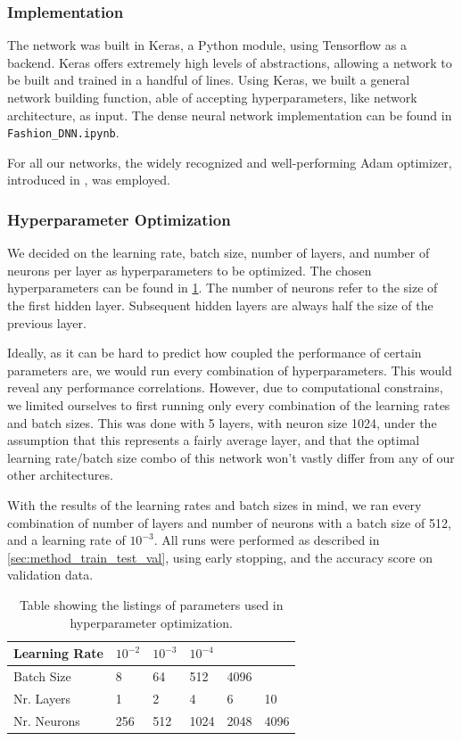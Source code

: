 \documentclass[10pt, twocolumn]{article}
\begin{document}
\subsubsection{Implementation}
The network was built in Keras, a Python module, using Tensorflow as a backend. Keras offers extremely high levels of abstractions, allowing a network to be built and trained in a handful of lines. Using Keras, we built a general network building function, able of accepting hyperparameters, like network architecture, as input. The dense neural network implementation can be found in \texttt{Fashion\_DNN.ipynb}.

For all our networks, the widely recognized and well-performing Adam optimizer, introduced in \cite{adam}, was employed.



\subsubsection{Hyperparameter Optimization}
\label{sec:method_DNN_hp}
We decided on the learning rate, batch size, number of layers, and number of neurons per layer as hyperparameters to be optimized. The chosen hyperparameters can be found in \cref{tab:hp_table_DNN}. The number of neurons refer to the size of the first hidden layer. Subsequent hidden layers are always half the size of the previous layer.

Ideally, as it can be hard to predict how coupled the performance of certain parameters are, we would run every combination of hyperparameters. This would reveal any performance correlations. However, due to computational constrains, we limited ourselves to first running only every combination of the learning rates and batch sizes. This was done with 5 layers, with neuron size 1024, under the assumption that this represents a fairly average layer, and that the optimal learning rate/batch size combo of this network won't vastly differ from any of our other architectures.

With the results of the learning rates and batch sizes in mind, we ran every combination of number of layers and number of neurons with a batch size of 512, and a learning rate of $10^{-3}$. All runs were performed as described in \cref{sec:method_train_test_val}, using early stopping, and the accuracy score on validation data.

\begin{table}[H]
    \centering
    \begin{tabular}{l|l l l l l}
        Learning Rate & $10^{-2}$ & $10^{-3}$ & $10^{-4}$ & & \\
        \hline
        Batch Size & 8 & 64 & 512 & 4096 & \\
        \hline
        Nr. Layers & 1 & 2 & 4 & 6 & 10 \\
        \hline
        Nr. Neurons & 256 & 512 & 1024 & 2048 & 4096 \\
    \end{tabular}
    \caption{Table showing the listings of parameters used in hyperparameter optimization.}
    \label{tab:hp_table_DNN}
\end{table}
\end{document}

